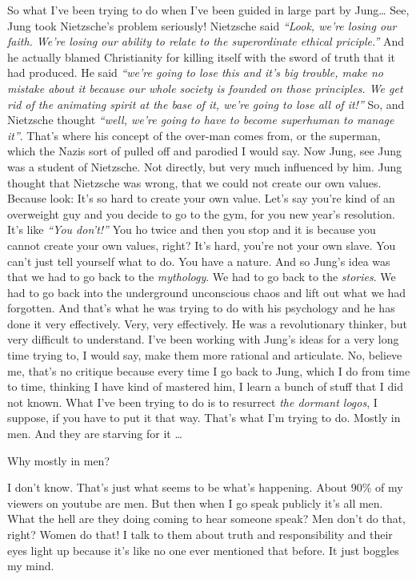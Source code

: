 \documentclass{memoir}
\newcommand{\qq}[1]{\emph{“#1”}}
\begin{document}
\begin{drama}
So what I’ve been trying to do when I’ve been guided in large part by Jung\ldots{} See, Jung took Nietzsche’s problem seriously! Nietzsche said \qq{Look, we’re losing our faith. We’re losing our ability to relate to the superordinate ethical priciple.} And he actually blamed Christianity for killing itself with the sword of truth that it had produced. He said \qq{we’re going to lose this and it’s big trouble, make no mistake about it because our whole society is founded on those principles. We get rid of the animating spirit at the base of it, we’re going to lose all of it!} So, and Nietzsche thought \qq{well, we’re going to have to become superhuman to manage it}. That’s where his concept of the over-man comes from, or the superman, which the Nazis sort of pulled off and parodied I would say. Now Jung, see Jung was a student of Nietzsche. Not directly, but very much influenced by him. Jung thought that Nietzsche was wrong, that we could not create our own values. Because look: It’s so hard to create your own value. Let’s say you’re kind of an overweight guy and you decide to go to the gym, for you new year’s resolution. It’s like \qq{You don’t!} You ho twice and then you stop and it is because you cannot create your own values, right? It’s hard, you’re not your own slave. You can’t just tell yourself what to do. You have a nature. And so Jung’s idea was that we had to go back to the \emph{mythology}. We had to go back to the \emph{stories}. We had to go back into the underground unconscious chaos and lift out what we had forgotten. And that’s what he was trying to do with his psychology and he has done it very effectively. Very, very effectively. He was a revolutionary thinker, but very difficult to understand. I’ve been working with Jung’s ideas for a very long time trying to, I would say, make them more rational and articulate. No, believe me, that’s no critique because every time I go back to Jung, which I do from time to time, thinking I have kind of mastered him, I learn a bunch of stuff that I did not known. What I’ve been trying to do is to resurrect \emph{the dormant logos}, I suppose, if you have to put it that way. That’s what I’m trying to do. Mostly in men. And they are starving for it \ldots{}

\jrspeaks Why mostly in men?

\jpspeaks I don’t know. That’s just what seems to be what’s happening. About 90\% of my viewers on youtube are men. But then when I go speak publicly it’s all men. What the hell are they doing coming to hear someone speak? Men don’t do that, right? Women do that! I talk to them about truth and responsibility and their eyes light up because it’s like no one ever mentioned that before. It just boggles my mind.


\end{drama}
\end{document}
